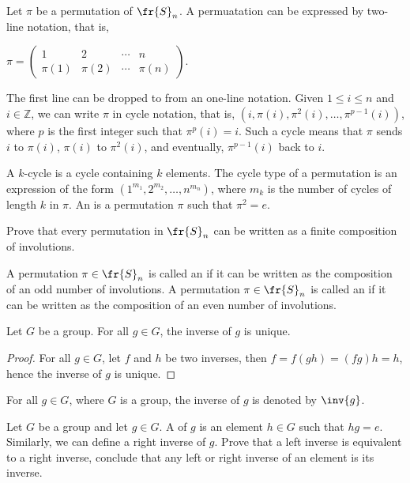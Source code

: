 \documentclass[10pt]{article}
\begin{document}
\par
Let $\pi$ be a permutation of ${\fr{S}}_{n}$. A permuatation can be expressed by two-line notation, that is, 
\begin{center}
    $\pi=
    \begin{pmatrix}
        1 & 2 & \cdots & n \\
        \pi(1) & \pi(2) & \cdots & \pi(n)
    \end{pmatrix}$.
\end{center}
\par
The first line can be dropped to from an one-line notation. Given $1\le i\le n$ and $i\in\mathbb{Z}$, we can write $\pi$ in cycle notation, that is, $(i,\pi(i),{\pi}^{2}(i),\ldots,{\pi}^{p-1}(i))$, where $p$ is the first integer such that ${\pi}^{p}(i)=i$. Such a cycle means that $\pi$ sends $i$ to $\pi(i)$, $\pi(i)$ to ${\pi}^{2}(i)$, and eventually, ${\pi}^{p-1}(i)$ back to $i$.
\par
A $k$-cycle is a cycle containing $k$ elements. The cycle type of a permutation is an expression of the form $({1}^{{m}_{1}},{2}^{{m}_{2}},\ldots,{n}^{{m}_{n}})$, where ${m}_{k}$ is the number of cycles of length $k$ in $\pi$. An  is a permutation $\pi$ such that ${\pi}^{2}=e$.
\begin{problem}
    Prove that every permutation in ${\fr{S}}_{n}$ can be written as a finite composition of involutions.
\end{problem}
\begin{definition}
    A permutation $\pi\in{\fr{S}}_{n}$ is called an  if it can be written as the composition of an odd number of involutions. A permutation $\pi\in{\fr{S}}_{n}$ is called an  if it can be written as the composition of an even number of involutions.
\end{definition}
\begin{proposition}
    Let $G$ be a group. For all $g\in G$, the inverse of $g$ is unique.
\end{proposition}
\begin{proof}
    For all $g\in G$, let $f$ and $h$ be two inverses, then $f=f(gh)=(fg)h=h$, hence the inverse of $g$ is unique.
\end{proof}
\par
For all $g\in G$, where $G$ is a group, the inverse of $g$ is denoted by $\inv{g}$.
\begin{problem}
    Let $G$ be a group and let $g\in G$. A  of $g$ is an element $h\in G$ such that $hg=e$. Similarly, we can define a right inverse of $g$. Prove that a left inverse is equivalent to a right inverse, conclude that any left or right inverse of an element is its inverse.
\end{problem}
\end{document}
